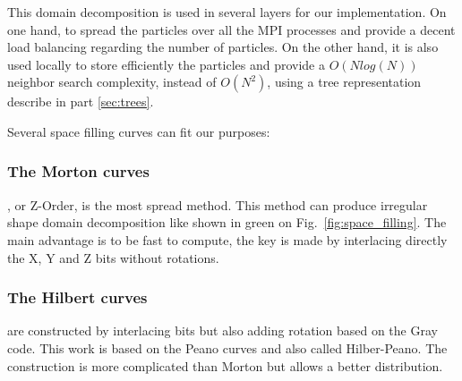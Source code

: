 This domain decomposition is used in several layers for our implementation. 
On one hand, to spread the particles over all the MPI processes and provide a decent load balancing regarding the number of particles. 
On the other hand, it is also used locally to store efficiently the particles and provide a $O(N log(N))$ neighbor search complexity, instead of $O(N^2)$, using a tree representation describe in part \ref{sec:trees}. 

Several space filling curves can fit our purposes:
\subsubsection*{The Morton curves} \cite{morton1966computer}, or Z-Order, is the most spread method. 
This method can produce irregular shape domain decomposition like shown in green on Fig.~\ref{fig:space_filling}. 
The main advantage is to be fast to compute, the key is made by interlacing directly the X, Y and Z bits without rotations. 
\subsubsection*{The Hilbert curves} \cite{sagan2012space} are constructed by interlacing bits but also adding rotation based on the Gray code.
This work is based on the Peano curves and also called Hilber-Peano. 
The construction is more complicated than Morton but allows a better distribution. 

